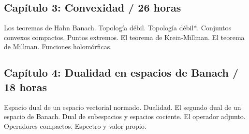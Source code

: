 \subsection*{Capítulo 3: Convexidad / 26 horas}

Los teoremas de Hahn Banach.
Topología débil.
Topología débil$\ast$.
Conjuntos convexos compactos.
Puntos extremos.
El teorema de Krein-Millman.
El teorema de Millman.
Funciones holomórficas.

\subsection*{Capítulo 4: Dualidad en espacios de Banach / 18 horas}

Espacio dual de un espacio vectorial normado.
Dualidad.
El segundo dual de un espacio de Banach.
Dual de subespacios y espacios cociente.
El operador adjunto.
Operadores compactos.
Espectro y valor propio.






